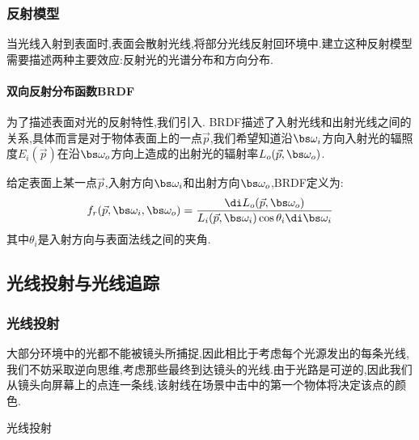 \documentclass{ctexart}
\begin{document}
\subsubsection{反射模型}
当光线入射到表面时,表面会散射光线,将部分光线反射回环境中.建立这种反射模型需要描述两种主要效应:反射光的光谱分布和方向分布.
\paragraph{双向反射分布函数BRDF}
为了描述表面对光的反射特性,我们引入. BRDF描述了入射光线和出射光线之间的关系,具体而言是对于物体表面上的一点$\vec{p}$,我们希望知道沿$\bs\omega_i$方向入射光的辐照度$E_i(\vec{p})$在沿$\bs\omega_o$方向上造成的出射光的辐射率$L_o(\vec{p},\bs\omega_o)$.
\begin{definition}[双向反射分布函数]
    给定表面上某一点$\vec{p}$,入射方向$\bs\omega_i$和出射方向$\bs\omega_o$,BRDF定义为:
    \[f_r(\vec{p},\bs\omega_i,\bs\omega_o)=\dfrac{\di L_o(\vec{p},\bs\omega_o)}{L_i(\vec{p},\bs\omega_i)\cos\theta_i\di\bs\omega_i}\]
    其中$\theta_i$是入射方向与表面法线之间的夹角.
\end{definition}
\subsection{光线投射与光线追踪}
\subsubsection{光线投射}
大部分环境中的光都不能被镜头所捕捉,因此相比于考虑每个光源发出的每条光线,我们不妨采取逆向思维,考虑那些最终到达镜头的光线.由于光路是可逆的,因此我们从镜头向屏幕上的点连一条线,该射线在场景中击中的第一个物体将决定该点的颜色.
\begin{definition}[光线透射]
    光线投射
\end{definition}
\end{document}
